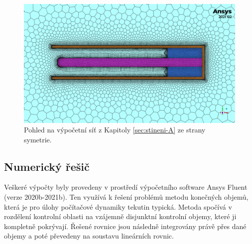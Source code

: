         \begin{figure}
            \centering
            \includegraphics[width=\textwidth]{300_VYPOCETNI_MODEL/mesh_sym_odvetrani_A.png}
            \caption{Pohled na výpočetní síť z Kapitoly \ref{sec:stineni-A} ze strany symetrie.}
            \label{fig:sit-detail-stineni-A}
        \end{figure}
        
    \subsection{Numerický řešič}
        Veškeré výpočty byly provedeny v prostředí výpočetního software Ansys Fluent (verze 2020b-2021b). Ten využívá k řešení problémů metodu konečných objemů, která je pro úlohy počítačové dynamiky tekutin typická. Metoda spočívá v rozdělení kontrolní oblasti na vzájemně disjunktní kontrolní objemy, které ji kompletně pokrývají. Řešené rovnice jsou následně integrovány právě přes dané objemy a poté převedeny na soustavu lineárních rovnic.
